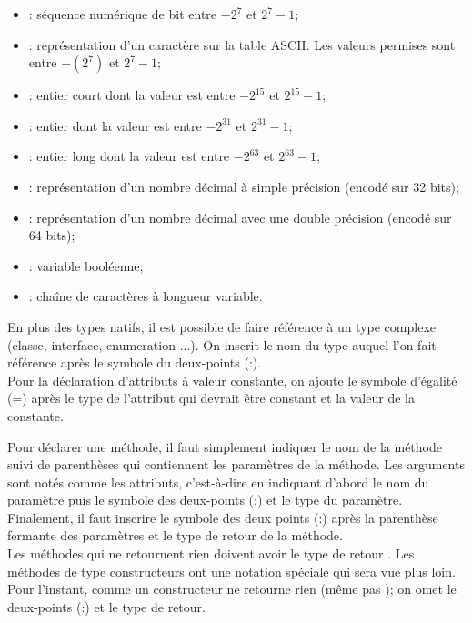 \begin{itemize}
	\item {} : séquence numérique de bit entre $-2^7$ et $2^7-1$;
	\item {} : représentation d'un caractère sur la table ASCII. Les valeurs permises sont entre $-(2^7)$ et $2^7-1$;
	\item {} : entier court dont la valeur est entre $-2^{15}$ et $2^{15}-1$; 
	\item {} : entier dont la valeur est entre $-2^{31}$ et $2^{31}-1$;
	\item {} : entier long dont la valeur est entre $-2^{63}$ et $2^{63}-1$;
	\item {} : représentation d'un nombre décimal à simple précision (encodé sur 32 bits);
	\item {} : représentation d'un nombre décimal avec une double précision (encodé sur 64 bits);
	\item {} : variable booléenne;
	\item {} : chaîne de caractères à longueur variable.
\end{itemize}

En plus des types natifs, il est possible de faire référence à un type complexe (\gls{classe}, \gls{interface}, \gls{enumeration} ...). On inscrit le nom du type auquel l'on fait référence après le symbole du deux-points (:).\\

Pour la déclaration d'attributs à valeur constante, on ajoute le symbole d'égalité (=) après le type de l'attribut qui devrait être constant et la valeur de la constante.

Pour déclarer une méthode, il faut simplement indiquer le nom de la méthode suivi de parenthèses qui contiennent les paramètres de la méthode. Les arguments sont notés comme les \glspl{attribut}, c'est-à-dire en indiquant d'abord le nom du paramètre puis le symbole des deux-points ({\NoAutoSpacing  :}) et le type du paramètre. Finalement, il faut inscrire le symbole des deux points ({\NoAutoSpacing  :}) après la parenthèse fermante des paramètres et le type de retour de la méthode.\\


Les méthodes qui ne retournent rien doivent avoir le type de retour . Les méthodes de type \glspl{constructeur} ont une notation spéciale qui sera vue plus loin. Pour l'instant, comme un \gls{constructeur} ne retourne rien (même pas ); on omet le deux-points ({\NoAutoSpacing  :}) et le type de retour. 


